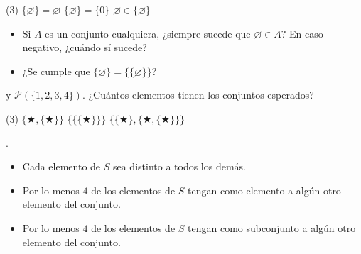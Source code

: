 \documentclass[oneside]{style}
\begin{document}
\begin{questions}[label=\protect\circled{\bfseries\arabic*}]
    \begin{tasks}(3)
        \task $\{\varnothing\} = \varnothing$
        \task $\{\varnothing\} = \{0\}$
        \task $\varnothing \in \{\varnothing\}$
    \end{tasks}

    \begin{itemize}
        \item Si $A$ es un conjunto cualquiera, ¿siempre sucede que 
        $\varnothing \in A$? En caso negativo, ¿cuándo sí sucede?

        \item ¿Se cumple que $\{\varnothing\} = \{\{\varnothing\}\}$?
    \end{itemize}

     y 
    $\mathcal{P}(\{1,2,3,4\})$. ¿Cuántos elementos tienen los conjuntos 
    esperados?

    \begin{tasks}(3)
        \task $\{\bigstar, \{\bigstar\}\}$
        \task $\{\{\{\bigstar\}\}\}$
        \task $\{\{\bigstar\}, \{\bigstar, \{\bigstar\}\}\}$
    \end{tasks}

    .

    \begin{itemize}
        \item Cada elemento de $S$ sea distinto a todos los demás. 

        \item Por lo menos $4$ de los elementos de $S$ tengan como elemento 
        a algún otro elemento del conjunto. 

        \item Por lo menos $4$ de los elementos de $S$ tengan como subconjunto 
        a algún otro elemento del conjunto.
    \end{itemize}


\end{questions}
\end{document}
